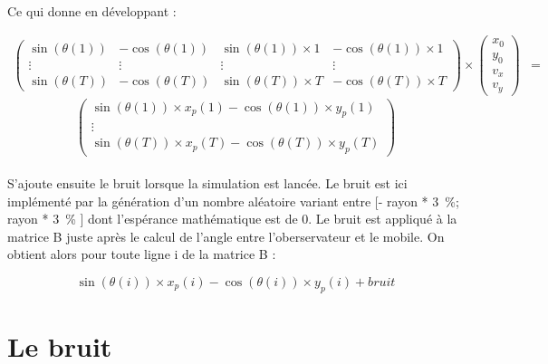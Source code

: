\documentclass[a4paper,11pt]{article}
\begin{document}
		\paragraph{}
		Ce qui donne en développant :

		\begin{equation}
				\begin{align*}
				\begin{pmatrix}
					\sin(\theta(1)) & -\cos(\theta(1))  & \sin(\theta(1))\times 1 & -\cos(\theta(1))\times 1  \\
					\vdots & \vdots  & \vdots & \vdots  \\
					\sin(\theta(T))  & -\cos(\theta(T))  &  \sin(\theta(T))\times T  &  -\cos(\theta(T))\times T
				\end{pmatrix}
				\times
				\begin{pmatrix}
				 x_0 \\
				 y_0 \\ 
				 v_x \\
				 v_y 
				\end{pmatrix}
				&= 
				\end{align*}
		\end{equation}
		\begin{equation*}
				\begin{pmatrix}
					\sin(\theta(1)) \times x_p(1) - \cos(\theta(1)) \times y_p(1)  \\
					\vdots \\
					\sin(\theta(T)) \times x_p(T) - \cos(\theta(T)) \times y_p(T)  
				\end{pmatrix}
		\end{equation*}

		\paragraph{}
		S'ajoute ensuite le bruit lorsque la simulation est lancée. Le bruit est ici implémenté par la génération d'un nombre aléatoire variant entre [- rayon * 3 \%; rayon * 3 \% ] dont l’espérance mathématique est de 0.
		Le bruit est appliqué à la matrice B juste après le calcul de l'angle entre l'oberservateur et le mobile. 
		On obtient alors pour toute ligne i de la matrice B :

			\begin{equation} 
				\sin(\theta(i)) \times x_p(i) - \cos(\theta(i)) \times y_p(i) + bruit
			\end{equation}


		\section{Le bruit}
\end{document}
